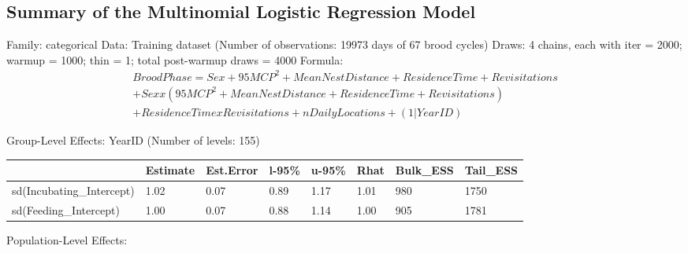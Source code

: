 \appendix \subsection{Summary of the Multinomial Logistic Regression Model} \label{appendix:mlrm_formula}
Family: categorical \newline
Data: Training dataset (Number of observations: 19973 days of 67 brood cycles) \newline
Draws: 4 chains, each with iter = 2000; warmup = 1000; thin = 1; total post-warmup draws = 4000 \newline
Formula:
\begin{align*}
BroodPhase = Sex + 95MCP^2 + MeanNestDistance + ResidenceTime + Revisitations \\
+ Sex x (95MCP^2 + MeanNestDistance + ResidenceTime + Revisitations) \\
+ ResidenceTime x Revisitations + nDailyLocations + (1 | YearID)
\end{align*}

\vspace{1\baselineskip}

\noindent Group-Level Effects: YearID (Number of levels: 155)

\begin{table}[H]
\footnotesize{
\begin{center}
\begin{tabular}{| p{5.3cm} | p{1.1cm} | p{1.1cm} | p{0.85cm} | p{0.95cm} | p{0.5cm} | p{1.3cm} | p{1.2cm} |} 
\hline
& \textbf{Estimate} & \textbf{Est.Error} & \textbf{l-95\%} & \textbf{u-95\%} & \textbf{Rhat} & \textbf{Bulk\_ESS} & \textbf{Tail\_ESS} \\
\hline
sd(Incubating\_Intercept) & 1.02 & 0.07 & 0.89 & 1.17 & 1.01 & 980 & 1750 \\ 
\hline
sd(Feeding\_Intercept) & 1.00 & 0.07 & 0.88 & 1.14 & 1.00 & 905 & 1781 \\
\hline
\end{tabular}
\end{center}
}
\end{table}


\noindent Population-Level Effects:

